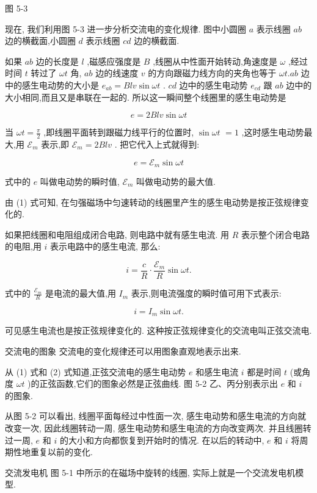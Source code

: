\documentclass[10pt]{article}
\begin{document}
图 5-3

现在, 我们利用图 5-3 进一步分析交流电的变化规律. 图中小圆圈 \(a\) 表示线圈 \({ab}\) 边的横截面,小圆圈 \(d\) 表示线圈 \({cd}\) 边的横截面.

如果 \({ab}\) 边的长度是 \(l\) ,磁感应强度是 \(B\) ,线圈从中性面开始转动,角速度是 \(\omega\) ,经过时间 \(t\) 转过了 \({\omega t}\) 角, \({ab}\) 边的线速度 \(v\) 的方向跟磁力线方向的夹角也等于 \({\omega t}.{ab}\) 边中的感生电动势的大小是 \({e}_{ab} = {Blv}\sin {\omega t}\) . \({cd}\) 边中的感生电动势 \({e}_{cd}\) 跟 \({ab}\) 边中的大小相同,而且又是串联在一起的. 所以这一瞬间整个线圈里的感生电动势是

\[
e = {2Blv}\sin {\omega t}
\]

当 \({\omega t} = \frac{\pi }{2}\) ,即线圈平面转到跟磁力线平行的位置时, \(\sin {\omega t}\) \(= 1\) ,这时感生电动势最大,用 \({\mathcal{E}}_{m}\) 表示,即 \({\mathcal{E}}_{m} = {2Blv}\) . 把它代入上式就得到:

\[
e = {\mathcal{E}}_{m}\sin {\omega t} \tag{1}
\]

式中的 \(e\) 叫做电动势的瞬时值, \({\mathcal{E}}_{m}\) 叫做电动势的最大值.

由 (1) 式可知, 在匀强磁场中匀速转动的线圈里产生的感生电动势是按正弦规律变化的.

如果把线圈和电阻组成闭合电路, 则电路中就有感生电流. 用 \(R\) 表示整个闭合电路的电阻,用 \(i\) 表示电路中的感生电流, 那么:

\[
i = \frac{c}{R} \cdot \frac{{\mathcal{E}}_{m}}{R}\sin {\omega t}.
\]

式中的 \(\frac{{\mathcal{E}}_{m}}{R}\) 是电流的最大值,用 \({I}_{m}\) 表示,则电流强度的瞬时值可用下式表示:

\[
i = {I}_{m}\sin {\omega t}. \tag{2}
\]

可见感生电流也是按正弦规律变化的. 这种按正弦规律变化的交流电叫正弦交流电.

交流电的图象 交流电的变化规律还可以用图象直观地表示出来.

从 (1) 式和 (2) 式知道,正弦交流电的感生电动势 \(e\) 和感生电流 \(i\) 都是时间 \(t\) (或角度 \({\omega t}\) )的正弦函数,它们的图象必然是正弦曲线. 图 5-2 乙、丙分别表示出 \(e\) 和 \(i\) 的图象.

从图 5-2 可以看出, 线圈平面每经过中性面一次, 感生电动势和感生电流的方向就改变一次, 因此线圈转动一周, 感生电动势和感生电流的方向改变两次. 并且线圈转过一周, \(e\) 和 \(i\) 的大小和方向都恢复到开始时的情况. 在以后的转动中, \(e\) 和 \(i\) 将周期性地重复以前的变化.

交流发电机 图 5-1 中所示的在磁场中旋转的线圈, 实际上就是一个交流发电机模型.
\end{document}
